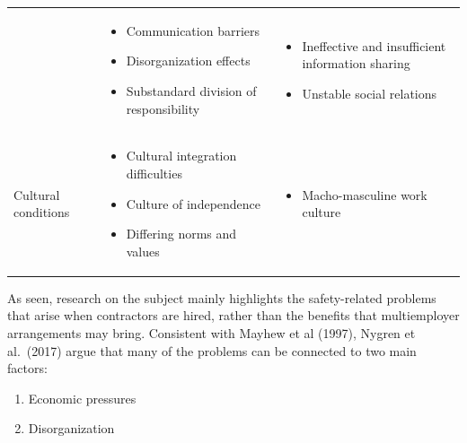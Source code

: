 \documentclass[
  12pt,
]{scrbook}
\providecommand{\tightlist}{%
  \setlength{\itemsep}{0pt}\setlength{\parskip}{0pt}}
\begin{document}
\begin{longtable}[]{@{}lll@{}}
\begin{minipage}[t]{0.31\columnwidth}
\end{minipage} & \begin{minipage}[t]{0.27\columnwidth}\raggedright
\begin{itemize}
\item
  Communication barriers
\item
  Disorganization effects
\item
  Substandard division of responsibility
\end{itemize}\strut
\end{minipage} & \begin{minipage}[t]{0.33\columnwidth}\raggedright
\begin{itemize}
\item
  Ineffective and insufficient information sharing
\item
  Unstable social relations
\end{itemize}\strut
\end{minipage}\tabularnewline
\begin{minipage}[t]{0.31\columnwidth}\raggedright
Cultural conditions\strut
\end{minipage} & \begin{minipage}[t]{0.27\columnwidth}\raggedright
\begin{itemize}
\item
  Cultural integration difficulties
\item
  Culture of independence
\item
  Differing norms and values
\end{itemize}\strut
\end{minipage} & \begin{minipage}[t]{0.33\columnwidth}\raggedright
\begin{itemize}
\tightlist
\item
  Macho-masculine work culture
\end{itemize}\strut
\end{minipage}\tabularnewline
\bottomrule
\end{longtable}

As seen, research on the subject mainly highlights the safety-related problems that arise when contractors are hired, rather than the benefits that multiemployer arrangements may bring. Consistent with Mayhew et al (1997), Nygren et al.~(2017) argue that many of the problems can be connected to two main factors:

\begin{enumerate}
\def\labelenumi{\arabic{enumi})}
\item
  Economic pressures
\item
  Disorganization
\end{enumerate}
\end{document}
